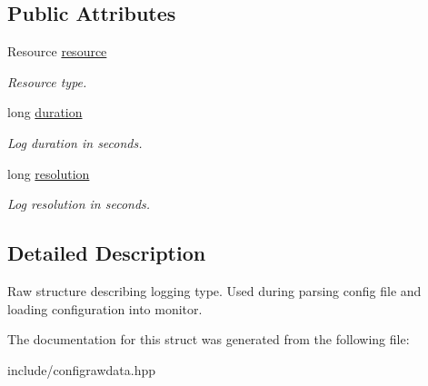 \subsection*{Public Attributes}
\begin{DoxyCompactItemize}
\item 
Resource \hyperlink{structLogType_a087631944f7ecf0e053174020f3bb901}{resource}\hypertarget{structLogType_a087631944f7ecf0e053174020f3bb901}{}\label{structLogType_a087631944f7ecf0e053174020f3bb901}

\begin{DoxyCompactList}\small\item\em Resource type. \end{DoxyCompactList}\item 
long \hyperlink{structLogType_abcb4df4d9f3d88cace362fd6734ad532}{duration}\hypertarget{structLogType_abcb4df4d9f3d88cace362fd6734ad532}{}\label{structLogType_abcb4df4d9f3d88cace362fd6734ad532}

\begin{DoxyCompactList}\small\item\em Log duration in seconds. \end{DoxyCompactList}\item 
long \hyperlink{structLogType_a25a9ccb6fc2e31491543fd08ccb31f37}{resolution}\hypertarget{structLogType_a25a9ccb6fc2e31491543fd08ccb31f37}{}\label{structLogType_a25a9ccb6fc2e31491543fd08ccb31f37}

\begin{DoxyCompactList}\small\item\em Log resolution in seconds. \end{DoxyCompactList}\end{DoxyCompactItemize}


\subsection{Detailed Description}
Raw structure describing logging type. Used during parsing config file and loading configuration into monitor. 

The documentation for this struct was generated from the following file\+:\begin{DoxyCompactItemize}
\item 
include/configrawdata.\+hpp\end{DoxyCompactItemize}

